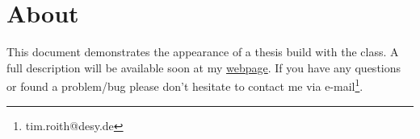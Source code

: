 \chapter{About}\label{ch:One}
This document demonstrates the appearance of a thesis build with the \texttt{\classname} 
class. A full description will be available soon at my
\href{https://timroith.github.io/}{webpage}. 
If you have any questions or found a problem/bug please don't hesitate to contact me 
via e-mail\footnote{tim.roith@desy.de}.